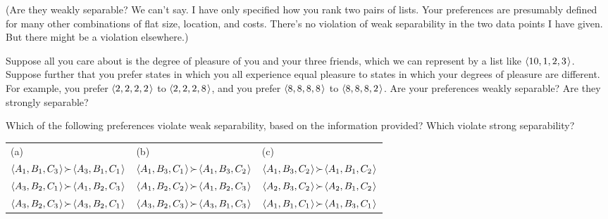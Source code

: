 (Are they weakly separable? We can't say. I have only specified how you rank two
pairs of lists. Your preferences are presumably defined for many other
combinations of flat size, location, and costs. There's no violation of weak
separability in the two data points I have given. But there might be a violation
elsewhere.)

\begin{exercise}{2}
  Suppose all you care about is the degree of pleasure of you and your three
  friends, which we can represent by a list like $\t{10,1,2,3}$. Suppose further
  that you prefer states in which you all experience equal pleasure to states in
  which your degrees of pleasure are different. For example, you prefer
  $\t{2,2,2,2}$ to $\t{2,2,2,8}$, and you prefer $\t{8,8,8,8}$ to $\t{8,8,8,2}$.
  Are your preferences weakly separable? Are they strongly separable?
\end{exercise}


\begin{exercise}{2}
  Which of the following preferences violate weak separability, based on the information provided? Which violate strong separability?

  \medskip

  {\small
  \noindent\hspace{-2mm}\begin{tabular}{lll}
    (a) & (b) & (c)\\
    $\t{A_1,B_1,C_3} \!\succ\! \t{A_3,B_1,C_1}$ & $\t{A_1,B_3,C_1} \!\succ\! \t{A_1,B_3,C_2}$  & $\t{A_1,B_3,C_2} \!\succ\! \t{A_1,B_1,C_2}$ \\ 
    $\t{A_3,B_2,C_1} \!\succ\! \t{A_1,B_2,C_3}$ &  $\t{A_1,B_2,C_2} \!\succ\! \t{A_1,B_2,C_3}$ &  $\t{A_2,B_3,C_2} \!\succ\! \t{A_2,B_1,C_2}$ \\
    $\t{A_3,B_2,C_3} \!\succ\! \t{A_3,B_2,C_1}$ &  $\t{A_3,B_2,C_3} \!\succ\! \t{A_3,B_1,C_3}$ &  $\t{A_1,B_1,C_1} \!\succ\! \t{A_1,B_3,C_1}$ 
 \end{tabular}  
 }
\end{exercise}

